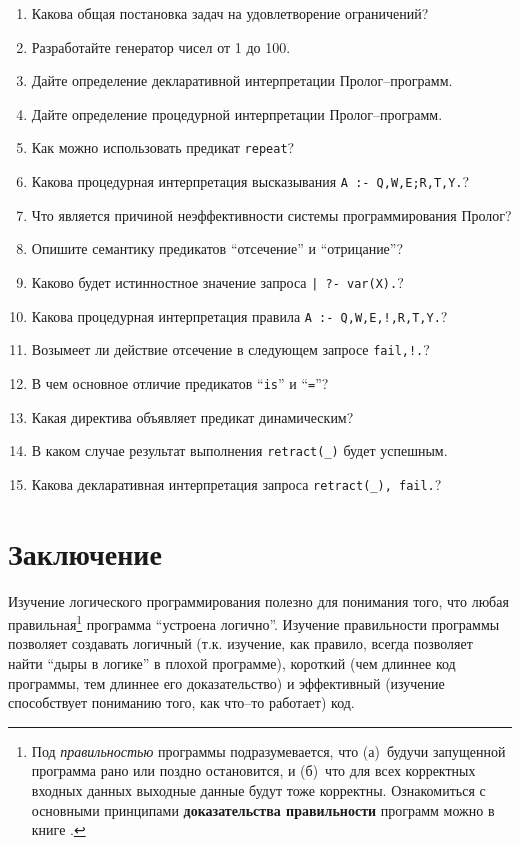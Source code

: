 \documentclass[12pt, openany, twoside]{book} %
\begin{document}
\begin{enumerate}
\item{} Какова общая постановка задач на удовлетворение ограничений?
\item{} Разработайте генератор чисел от 1 до 100.
\item{} Дайте определение декларативной интерпретации Пролог--программ.
\item{} Дайте определение процедурной интерпретации Пролог--программ.
\item{} Как можно использовать предикат \texttt{repeat}?
\item{} Какова процедурная интерпретация высказывания \texttt{A :- Q,W,E;R,T,Y.}?
\item{} Что является причиной неэффективности системы программирования Пролог?
\item{} Опишите семантику предикатов ``отсечение'' и ``отрицание''?
\item{} Каково будет истинностное значение запроса \texttt{| ?- var(X).}?
\item{} Какова процедурная интерпретация правила \texttt{A :- Q,W,E,!,R,T,Y.}?
\item{} Возымеет ли действие отсечение в следующем запросе \texttt{fail,!.}?
\item{} В чем основное отличие предикатов ``\texttt{is}'' и ``\texttt{=}''?
\item{} Какая директива объявляет предикат динамическим?
\item{} В каком случае результат выполнения \texttt{retract(\_)} будет успешным.
\item{} Какова декларативная интерпретация запроса \texttt{retract(\_), fail.}?
\end{enumerate}

\chapter*{Заключение}


Изучение логического программирования полезно для понимания того, что любая правильная\footnote{Под {\em правильностью} программы подразумевается, что (а)~будучи запущенной программа рано или поздно остановится, и (б)~что для всех корректных входных данных выходные данные будут тоже корректны. Ознакомиться с основными принципами {\bf доказательства правильности} программ можно в книге \cite{Anderson}.} программа ``устроена логично''. Изучение правильности программы позволяет создавать логичный (т.к. изучение, как правило, всегда позволяет найти ``дыры в логике'' в плохой программе), короткий (чем длиннее код программы, тем длиннее его доказательство) и эффективный (изучение способствует пониманию того, как что--то работает) код.
\end{document}
